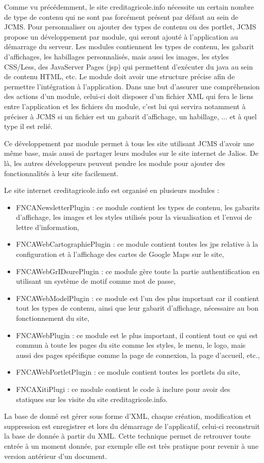 \documentclass[12pt,a4paper]{article}
\begin{document}
\medskip
Comme vu précédemment, le site creditagricole.info nécessite un certain nombre de type de contenu qui ne sont pas forcément présent par défaut au sein de JCMS. Pour personnaliser ou ajouter des types de contenu ou des portlet, JCMS propose un développement par module, qui seront ajouté à l'application au démarrage du serveur. Les modules contiennent les types de contenu, les gabarit d'affichages, les habillages personnalisés, mais aussi les images, les styles CSS/Less, des JavaServer Pages (jsp) qui permettent d'exécuter du java au sein de contenu HTML, etc. Le module doit avoir une structure précise afin de permettre l'intégration à l'application. Dans une but d'assurer une compréhension des actions d'un module, celui-ci doit disposer d'un fichier XML qui fera le liens entre l'application et les fichiers du module, c'est lui qui servira notamment à préciser à JCMS si un fichier est un gabarit d'affichage, un habillage, ... et à quel type il est relié.\par 
Ce développement par module permet à tous les site utilisant JCMS d'avoir une même base, mais aussi de partager leurs modules sur le site internet de Jalios. De là, les autres développeurs peuvent pendre les module pour ajouter des fonctionnalités à leur site facilement.\par 
Le site internet creditagricole.info est organisé en plusieurs modules :
\begin{itemize}
\item FNCANewsletterPlugin : ce module contient les types de contenu, les gabarits d'affichage, les images et les styles utilisés pour la visualisation et l'envoi de lettre d'information,
\item FNCAWebCartographiePlugin : ce module contient toutes les jps relative à la configuration et à l'affichage des cartes de Google Maps sur le site,
\item FNCAWebGrIDsurePlugin : ce module gère toute la partie authentification en utilisant un système de motif comme mot de passe,
\item FNCAWebModelPlugin : ce module est l'un des plus important car il contient tout les types de contenu, ainsi que leur gabarit d'affichage, nécessaire au bon fonctionnement du site,
\item FNCAWebPlugin : ce module est le plus important, il contient tout ce qui est commun à toute les pages du site comme les styles, le menu, le logo, mais aussi des pages spécifique comme la page de connexion, la page d'accueil, etc.,
\item FNCAWebPortletPlugin : ce module contient toutes les portlets du site,
\item FNCAXitiPlugi : ce module contient le code à inclure pour avoir des statiques sur les visite du site creditagricole.info.
\end{itemize}\par
La base de donné est gérer sous forme d'XML, chaque création, modification et suppression est enregistrer et lors du démarrage de l'applicatif, celui-ci reconstruit la base de donnée à partir du XML. Cette technique permet de retrouver toute entrée à un moment donnée, par exemple elle est très pratique pour revenir à une version antérieur d'un document.\par
\end{document}

